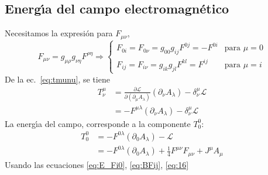 \subsection{Energ\'\i a del campo electromagn\'etico}
\begin{frame}


Necesitamos la expresi\'on para $F_{\mu\nu}$,
\begin{equation}
  \label{eq:16}
  F_{\mu\nu}=g_{\mu\rho}g_{\nu\eta}F^{\rho\eta}\Rightarrow
  \begin{cases}
    F_{0i}=F_{0\nu}=g_{00}g_{ij}F^{0j}=-F^{0i} &\text{para $\mu=0$}\\
    F_{ij}=F_{i\nu}=g_{ik}g_{jl}F^{kl}=F^{ij} &\text{para $\mu=i$}
  \end{cases}
\end{equation}
De la ec.~\eqref{eq:tmunu}, se tiene
\begin{align}
  T^\mu_\nu&=\frac{\partial\mathcal{L}}{\partial(\partial_\mu A_\lambda)}(\partial_\nu A_\lambda)
  -\delta^\mu_\nu\mathcal{L}\nonumber\\
  &=-F^{\mu\lambda}(\partial_\nu A_\lambda)-\delta^\mu_\nu\mathcal{L}
\end{align}
La energ\'\i a del campo, corresponde a la componente $T^0_0$:
\begin{align}
\label{eq:17}
  T^0_0&=-F^{0\lambda}(\partial_0A_\lambda)-\mathcal{L}\nonumber\\
  &=-F^{0\lambda}(\partial_0A_\lambda)+\frac{1}{4}F^{\mu\nu}F_{\mu\nu}+J^\mu A_\mu\nonumber
\end{align}
Usando las ecuaciones 
\eqref{eq:E_Fi0}, %
\eqref{eq:BFij}, \eqref{eq:16}


\end{frame}
